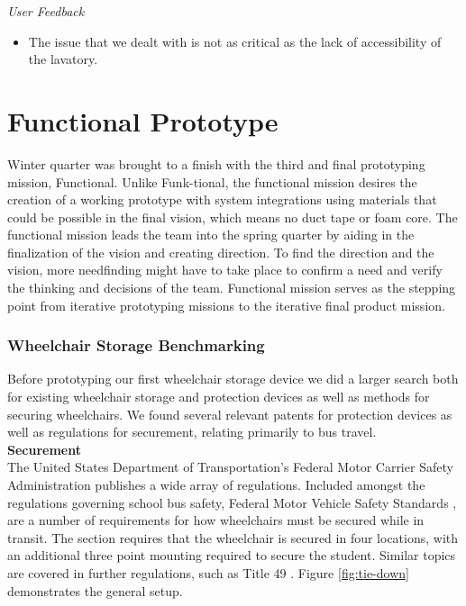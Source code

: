 \emph{User Feedback}
\begin{itemize}
	\item The issue that we dealt with is not as critical as the lack of accessibility of the lavatory.
\end{itemize}


\section{Functional Prototype}
Winter quarter was brought to a finish with the third and final prototyping mission, Functional.  Unlike Funk-tional, the functional mission desires the creation of a working prototype with system integrations using materials that could be possible in the final vision, which means no duct tape or foam core. The functional mission leads the team into the spring quarter by aiding in the finalization of the vision and creating direction.  To find the direction and the vision, more needfinding might have to take place to confirm a need and verify the thinking and decisions of the team. Functional mission serves as the stepping point from iterative prototyping missions to the iterative final product mission.

\subsubsection{Wheelchair Storage Benchmarking}
Before prototyping our first wheelchair storage device we did a larger search both for existing wheelchair storage and protection devices as well as methods for securing wheelchairs. We found several relevant patents for protection devices as well as regulations for securement, relating primarily to bus travel. \\

\noindent\textbf{Securement}\\
The United States Department of Transportation's Federal Motor Carrier Safety Administration publishes a wide array of regulations. Included amongst the regulations governing school bus safety, Federal Motor Vehicle Safety Standards  \cite{fmvs222}, are a number of requirements for how wheelchairs must be secured while in transit. The section requires that the wheelchair is secured in four locations, with an additional three point mounting required to secure the student. Similar topics are covered in further regulations, such as Title 49  \cite{ecfr}. Figure \ref{fig:tie-down} demonstrates the general setup. \\

